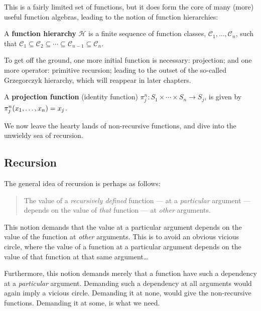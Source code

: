 This is a fairly limited set of functions, but it does form the core of many
(more) useful function algebras, leading to the notion of function hierarchies:

\begin{definition} A \textbf{function hierarchy} $\mathcal{H}$ is a finite
sequence of function classes, $\mathcal{C}_1, \ldots, \mathcal{C}_n$, such that
$\mathcal{C}_1 \subseteq \mathcal{C}_2 \subseteq \cdots \subseteq
\mathcal{C}_{n-1} \subseteq \mathcal{C}_n$. \end{definition}

To get off the ground, one more initial function is necessary: projection; and
one more operator: primitive recursion; leading to the outset of the so-called
Grzegorczyk hierarchy, which will reappear in later chapters.

\begin{definition} A \textbf{projection function} (identity function) $\pi_j^n
: S_1 \times \cdots \times S_n \rightarrow S_j$, is given by
$\pi_j^n{\mathopen{}\left({x_1,\ldots,x_n}\right)\mathclose{}} = x_j$. \end{definition}

We now leave the hearty lands of non-recursive functions, and dive into the
unwieldy sea of recursion.

\subsection{Recursion}

The general idea of recursion is perhaps as follows:

\begin{quote}

The value of a \emph{recursively defined} function --- at a \emph{particular}
argument --- depends on the value of \emph{that} function --- at \emph{other}
arguments.

\end{quote}

This notion demands that the value at a particular argument depends on the
value of the function at \emph{other} arguments. This is to avoid an obvious
vicious circle, where the value of a function at a particular argument depends
on the value of that function at that same argument\ldots

Furthermore, this notion demands merely that a function have such a dependency
at a \emph{particular} argument. Demanding such a dependency at all arguments
would again imply a vicious circle. Demanding it at none, would give the
non-recursive functions. Demanding it at some, is what we need.

